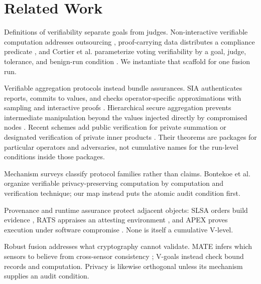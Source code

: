 \section{Related Work}
\label{sec:related}

Definitions of verifiability separate goals from judges. Non-interactive
verifiable computation addresses outsourcing \cite{gennaro2010},
proof-carrying data distributes a compliance predicate \cite{chiesa2010pcd},
and Cortier et al. parameterize voting verifiability by a goal, judge, tolerance,
and benign-run condition \cite{cortier2016}. We instantiate that scaffold for
one fusion run.

Verifiable aggregation protocols instead bundle assurances. SIA authenticates
reports, commits to values, and checks
operator-specific approximations with sampling and interactive proofs
\cite{przydatek2003sia}. Hierarchical secure aggregation prevents intermediate
manipulation beyond the values injected directly by compromised nodes
\cite{chan2006hierarchical}. Recent schemes add public verification for private
summation \cite{palazzo2024mpvas} or designated verification of private inner
products \cite{zhou2024ppvda}. Their theorems are packages for particular
operators and adversaries, not cumulative names for the run-level conditions
inside those packages.

Mechanism surveys classify protocol families rather than claims.
Bontekoe et al. \cite{bontekoe2025} organize verifiable privacy-preserving
computation by computation and verification technique; our map instead puts
the atomic audit condition first.

Provenance and runtime assurance protect adjacent objects: SLSA orders build
evidence \cite{slsa}, RATS appraises an attesting environment \cite{rfc9334},
and APEX proves execution under software compromise \cite{apex2020}. None is
itself a cumulative V-level.

Robust fusion addresses what cryptography cannot validate. MATE infers which
sensors to believe from cross-sensor consistency \cite{mate2025}; V-goals
instead check bound records and computation. Privacy is likewise orthogonal
unless its mechanism supplies an audit condition.

